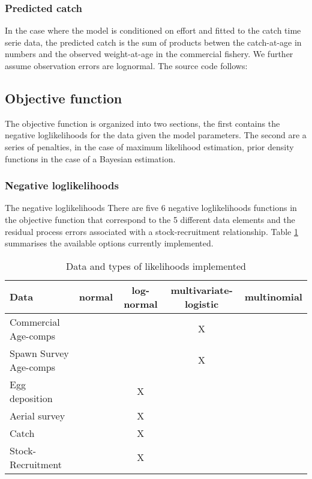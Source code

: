 \documentclass[12pt,letterpaper]{article}
\begin{document}
    \subsubsection{Predicted catch} %
    \label{ssub:predicted_catch}
    In the case where the model is conditioned on effort and fitted to the catch time serie data, the predicted catch is the sum of products betwen the catch-at-age in numbers and the observed weight-at-age in the commercial fishery.
    We further assume observation errors are lognormal. The source code follows:
    

  \subsection{Objective function} %
  \label{sub:objective_function}
  The objective function is organized into two sections, the first contains the negative loglikelihoods for the data given the model parameters.  The second are a series of penalties, in the case of maximum likelihood estimation, prior density functions in the case of a Bayesian estimation.
    \subsubsection{Negative loglikelihoods} %
    \label{ssub:negative_loglikelihoods}
    The negative loglikelihoods 
    There are five 6 negative loglikelihoods functions in the objective function that correspond to the 5 different data elements and the residual process errors associated with a stock-recruitment relationship. Table \ref{tab:likelihoodOptions} summarises the available options currently implemented.

    \begin{table}[h]
      \caption{Data and types of likelihoods implemented}
      \label{tab:likelihoodOptions}
      \begin{tabular}{l|c|c|c|c}
        \hline
        Data & normal & log-normal & multivariate-logistic & multinomial\\
        \hline
        Commercial Age-comps & & & X\\
        Spawn Survey Age-comps & & & X\\
        Egg deposition & & X & \\
        Aerial survey & & X  & \\
        Catch  & & X & \\
        Stock-Recruitment & & X & \\
      \end{tabular}
    \end{table}
\end{document}

